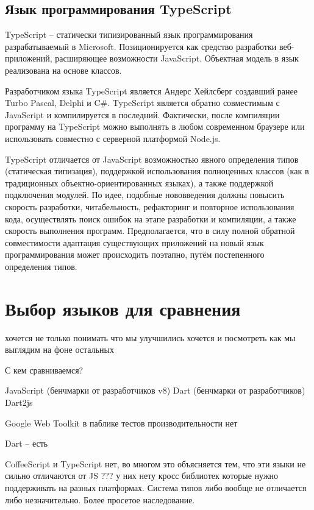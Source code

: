 \subsection{Язык программирования TypeScript}

TypeScript -- статически типизированный язык программирования разрабатываемый в Microsoft. Позиционируется как средство разработки веб-приложений, расширяющее возможности JavaScript. Объектная модель в язык реализована на основе классов.

Разработчиком языка TypeScript является Андерс Хейлсберг создавший ранее Turbo Pascal, Delphi и C\#.
TypeScript является обратно совместимым с JavaScript и компилируется в последний. Фактически, после компиляции программу на TypeScript можно выполнять в любом современном браузере или использовать совместно с серверной платформой Node.js.

TypeScript отличается от JavaScript возможностью явного определения типов (статическая типизация), поддержкой использования полноценных классов (как в традиционных объектно-ориентированных языках), а также поддержкой подключения модулей. По идее, подобные нововведения должны повысить скорость разработки, читабельность, рефакторинг и повторное использования кода, осуществлять поиск ошибок на этапе разработки и компиляции, а также скорость выполнения программ.
Предполагается, что в силу полной обратной совместимости адаптация существующих приложений на новый язык программирования может происходить поэтапно, путём постепенного определения типов. \cite{wiki:TypeScript, TypeScript}

\section{Выбор языков для сравнения}

хочется не только понимать что мы улучшились хочется и посмотреть как мы выглядим на фоне остальных

С кем сравниваемся?

JavaScript (бенчмарки от разработчиков v8)
Dart (бенчмарки от разработчиков)
Dart2js

Google Web Toolkit
в паблике тестов производительности нет

Dart -- есть

CoffeeScript и TypeScript нет, во многом это объясняется тем, что эти языки не сильно отличаются от JS ??? у них нету кросс библиотек которые нужно поддерживать на разных платформах. Система типов либо вообще не отличается либо незначительно. Более просетое наследование.

